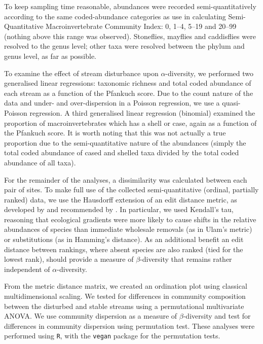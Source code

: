 \documentclass[a4paper,10pt]{article}
\begin{document}
To keep sampling time reasonable, abundances were recorded semi-quantitatively according to the same coded-abundance categories as use in calculating  Semi-Quantitative Macroinvertebrate Community Index:
0, 1--4, 5--19 and 20--99 (nothing above this range was observed).
Stoneflies, mayflies and caddisflies were resolved to the genus level; other taxa were resolved between the phylum and genus level, as far as possible.

To examine the effect of stream disturbance upon $\alpha$-diversity, we performed two generalised linear regressions: taxonomic richness and total coded abundance of each stream as a function of the Pfankuch score.
Due to the count nature of the data and under- and over-dispersion in a Poisson regression, we use a quasi-Poisson regression.
A third generalised linear regression (binomial) examined the proportion of macroinvertebrates which has a shell or case, again as a function of the Pfankuch score.
It is worth noting that this was not actually a true proportion due to the semi-quantitative nature of the abundances (simply the total coded abundance of cased and shelled taxa divided by the total coded abundance of all taxa).

For the remainder of the analyses, a dissimilarity was calculated between each pair of sites.
To make full use of the collected semi-quantitative (ordinal, partially ranked) data, we use the Hausdorff extension of an edit distance metric, as developed by \textcite{critchlow} and recommended by \textcite{dissimilarity-partially-ranked}.
In particular, we used Kendall's tau, reasoning that ecological gradients were more likely to cause shifts in the relative abundances of species than immediate wholesale removals (as in Ulam's metric) or substitutions (as in Hamming's distance).
As an additional benefit an edit distance between rankings, where absent species are also ranked (tied for the lowest rank), should provide a measure of $\beta$-diversity that remains rather independent of $\alpha$-diversity.

From the metric distance matrix, we created an ordination plot using classical multidimensional scaling.
We tested for differences in community composition between the disturbed and stable streams using a permutational multivariate ANOVA.
We use community dispersion as a measure of $\beta$-diversity \parencite{dispersion-diversity} and test for differences in community dispersion using  permutation test.
These analyses were performed using \texttt{R}, with the \texttt{vegan} package \parencite{vegan} for the permutation tests.
\end{document}
